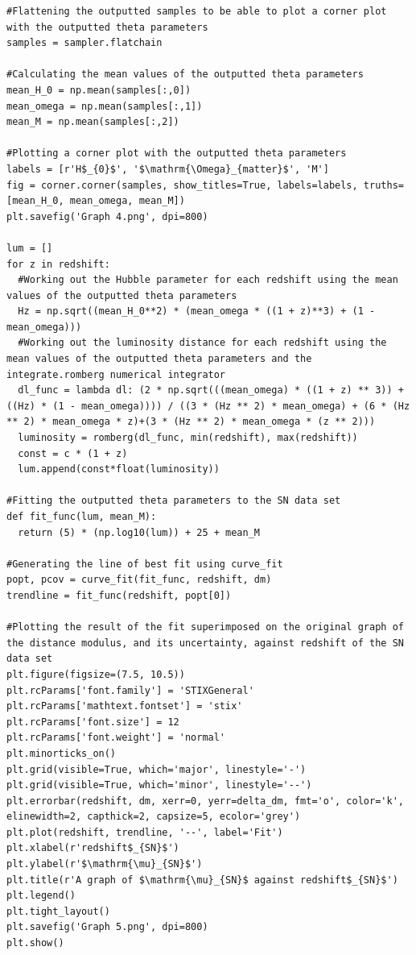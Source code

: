 \documentclass[12pt, a4paper]{article}
\begin{document}
\begin{verbatim}
#Flattening the outputted samples to be able to plot a corner plot with the outputted theta parameters
samples = sampler.flatchain

#Calculating the mean values of the outputted theta parameters
mean_H_0 = np.mean(samples[:,0])
mean_omega = np.mean(samples[:,1])
mean_M = np.mean(samples[:,2])

#Plotting a corner plot with the outputted theta parameters
labels = [r'H$_{0}$', '$\mathrm{\Omega}_{matter}$', 'M']
fig = corner.corner(samples, show_titles=True, labels=labels, truths=[mean_H_0, mean_omega, mean_M])
plt.savefig('Graph 4.png', dpi=800)

lum = []
for z in redshift:
  #Working out the Hubble parameter for each redshift using the mean values of the outputted theta parameters
  Hz = np.sqrt((mean_H_0**2) * (mean_omega * ((1 + z)**3) + (1 - mean_omega)))
  #Working out the luminosity distance for each redshift using the mean values of the outputted theta parameters and the integrate.romberg numerical integrator
  dl_func = lambda dl: (2 * np.sqrt(((mean_omega) * ((1 + z) ** 3)) + ((Hz) * (1 - mean_omega)))) / ((3 * (Hz ** 2) * mean_omega) + (6 * (Hz ** 2) * mean_omega * z)+(3 * (Hz ** 2) * mean_omega * (z ** 2)))
  luminosity = romberg(dl_func, min(redshift), max(redshift))
  const = c * (1 + z)
  lum.append(const*float(luminosity))

#Fitting the outputted theta parameters to the SN data set
def fit_func(lum, mean_M):
  return (5) * (np.log10(lum)) + 25 + mean_M

#Generating the line of best fit using curve_fit
popt, pcov = curve_fit(fit_func, redshift, dm)
trendline = fit_func(redshift, popt[0])

#Plotting the result of the fit superimposed on the original graph of the distance modulus, and its uncertainty, against redshift of the SN data set
plt.figure(figsize=(7.5, 10.5))
plt.rcParams['font.family'] = 'STIXGeneral'
plt.rcParams['mathtext.fontset'] = 'stix'
plt.rcParams['font.size'] = 12
plt.rcParams['font.weight'] = 'normal'
plt.minorticks_on()
plt.grid(visible=True, which='major', linestyle='-')
plt.grid(visible=True, which='minor', linestyle='--')
plt.errorbar(redshift, dm, xerr=0, yerr=delta_dm, fmt='o', color='k', elinewidth=2, capthick=2, capsize=5, ecolor='grey')
plt.plot(redshift, trendline, '--', label='Fit')
plt.xlabel(r'redshift$_{SN}$')
plt.ylabel(r'$\mathrm{\mu}_{SN}$')
plt.title(r'A graph of $\mathrm{\mu}_{SN}$ against redshift$_{SN}$')
plt.legend()
plt.tight_layout()
plt.savefig('Graph 5.png', dpi=800)
plt.show()
\end{verbatim}
\end{document}
